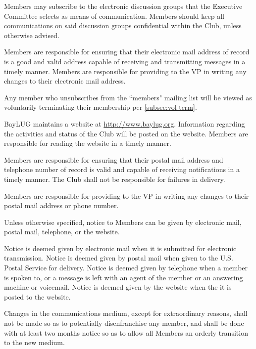 \documentclass{bylaws}
\begin{document}
Members may subscribe to the electronic discussion groups that the Executive Committee selects as means of communication.  Members should keep all communications on said discussion groups confidential within the Club, unless otherwise advised. 

Members are responsible for ensuring that their electronic mail address of record is a good and valid address capable of receiving and transmitting messages in a timely manner.  Members are responsible for providing to the VP in writing any changes to their electronic mail address. 

Any member who unsubscribes from the ``members" mailing list will be viewed as voluntarily terminating their membership per \ref{subsec:vol-term}. 

BayLUG maintains a website at \url{http://www.baylug.org}.  Information regarding the activities and status of the Club will be posted on the website.  Members are responsible for reading the website in a timely manner.

Members are responsible for ensuring that their postal mail address and telephone number of record is valid and capable of receiving notifications in a timely manner. The Club shall not be responsible for failures in delivery. 

Members are responsible for providing to the VP in writing any changes to their postal mail address or phone number. 

\label{sec:notice}
Unless otherwise specified, notice to Members can be given by electronic mail, postal mail, telephone, or the website. 

Notice is deemed given by electronic mail when it is submitted for electronic transmission. Notice is deemed given by postal mail when given to the U.S. Postal Service for delivery.  Notice is deemed given by telephone when a member is spoken to, or a message is left with an agent of the member or an answering machine or voicemail.  Notice is deemed given by the website when the it is posted to the website. 

Changes in the communications medium, except for extraordinary reasons, shall not be made so as to potentially disenfranchise any member, and shall be done with at least two months notice so as to allow all Members an orderly transition to the new medium. 

\end{document}

